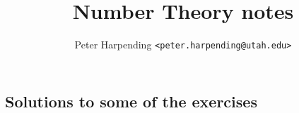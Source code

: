 \theoremstyle{definition}
\newtheorem{definition}{Definition}[section]
\newtheorem{example}[definition]{Example}
\newtheorem{remark}[definition]{Remark}
\newtheorem{aside}[definition]{Aside}

\theoremstyle{plain}
\newtheorem{theorem}[definition]{Theorem}
\newtheorem{lemma}[definition]{Lemma}
\newtheorem{corollary}[definition]{Corollary}



\nocite{*}


\title{Number Theory notes}
\author{Peter Harpending \texttt{<peter.harpending@utah.edu>}}
\maketitle
\tableofcontents

\setcounter{chapter}{-1}



\begin{appendices}
  \chapter{Solutions to some of the exercises}

  \shipoutAnswer
\end{appendices}

\printbibliography


